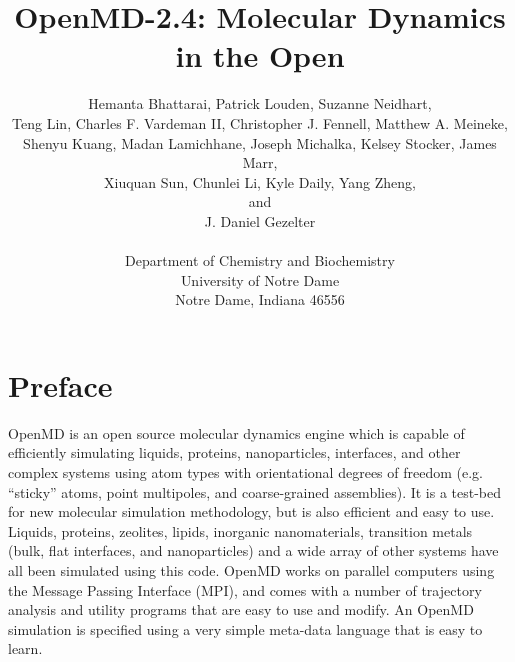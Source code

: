 \documentclass[]{book}
\begin{document}





\title{{\sc OpenMD-2.4}: Molecular Dynamics in the Open}

\author{Hemanta Bhattarai, Patrick Louden, Suzanne
  Neidhart, \\
  Teng Lin, Charles F. Vardeman II, Christopher J. Fennell, Matthew
  A. Meineke, \\ Shenyu Kuang, Madan Lamichhane, Joseph Michalka, 
  Kelsey Stocker, James Marr, \\ Xiuquan Sun,
  Chunlei Li,  Kyle Daily, Yang Zheng, \\ and \\
  J. Daniel Gezelter \\ \\
  Department of Chemistry and Biochemistry\\
  University of Notre Dame\\
  Notre Dame, Indiana 46556}

\maketitle

\section*{Preface} 

{\sc OpenMD} is an open source molecular dynamics engine which is
capable of efficiently simulating liquids, proteins, nanoparticles,
interfaces, and other complex systems using atom types with
orientational degrees of freedom (e.g. ``sticky'' atoms, point
multipoles, and coarse-grained assemblies). It is a test-bed for new
molecular simulation methodology, but is also efficient and easy to
use.  Liquids, proteins, zeolites, lipids, inorganic nanomaterials,
transition metals (bulk, flat interfaces, and nanoparticles) and a
wide array of other systems have all been simulated using this
code. {\sc OpenMD} works on parallel computers using the Message
Passing Interface (MPI), and comes with a number of trajectory
analysis and utility programs that are easy to use and modify. An
OpenMD simulation is specified using a very simple meta-data language
that is easy to learn.
\end{document}
